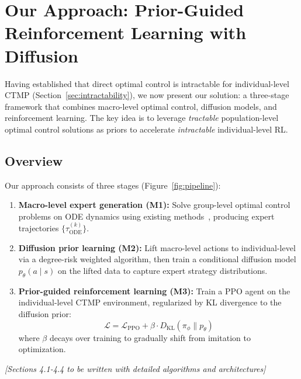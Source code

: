 
\section{Our Approach: Prior-Guided Reinforcement Learning with Diffusion}
\label{sec:our_approach}

Having established that direct optimal control is intractable for individual-level
CTMP (Section~\ref{sec:intractability}), we now present our solution: a three-stage
framework that combines macro-level optimal control, diffusion models, and reinforcement
learning. The key idea is to leverage \emph{tractable} population-level optimal control
solutions as priors to accelerate \emph{intractable} individual-level RL.

\subsection{Overview}

Our approach consists of three stages (Figure~\ref{fig:pipeline}):

\begin{enumerate}
    \item \textbf{Macro-level expert generation (M1):} Solve group-level optimal control
    problems on ODE dynamics using existing methods~\citep{师兄论文}, producing expert
    trajectories $\{\tau_{\text{ODE}}^{(k)}\}$.

    \item \textbf{Diffusion prior learning (M2):} Lift macro-level actions to individual-level
    via a degree-risk weighted algorithm, then train a conditional diffusion model
    $p_\theta(a \mid s)$ on the lifted data to capture expert strategy distributions.

    \item \textbf{Prior-guided reinforcement learning (M3):} Train a PPO agent on the
    individual-level CTMP environment, regularized by KL divergence to the diffusion prior:
    \begin{equation}
    \mathcal{L} = \mathcal{L}_{\text{PPO}} + \beta \cdot D_{\text{KL}}(\pi_\phi \| p_\theta)
    \end{equation}
    where $\beta$ decays over training to gradually shift from imitation to optimization.
\end{enumerate}

\textit{[Sections 4.1-4.4 to be written with detailed algorithms and architectures]}

